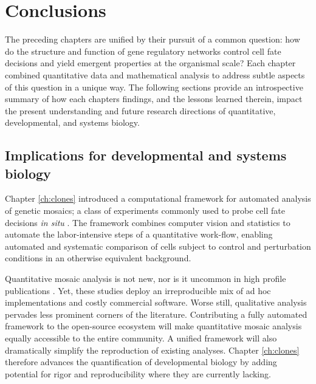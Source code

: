 \graphicspath{ {figures/conclusion/} }


\chapter{Conclusions}
\label{ch:conclusion}

The preceding chapters are unified by their pursuit of a common question: how do the structure and function of gene regulatory networks control cell fate decisions and yield emergent properties at the organismal scale? Each chapter combined quantitative data and mathematical analysis to address subtle aspects of this question in a unique way. The following sections provide an introspective summary of how each chapters findings, and the lessons learned therein, impact the present understanding and future research directions of quantitative, developmental, and systems biology. 

\section{Implications for developmental and systems biology}

Chapter \ref{ch:clones} introduced a computational framework for automated analysis of genetic mosaics; a class of experiments commonly used to probe cell fate decisions \textit{in situ} \cite{Germani2018,Atkins2019}. The framework combines computer vision and statistics to automate the labor-intensive steps of a quantitative work-flow, enabling automated and systematic comparison of cells subject to control and perturbation conditions in an otherwise equivalent background.

Quantitative mosaic analysis is not new, nor is it uncommon in high profile publications \cite{Dai2017,Gavish2016,Li2018}. Yet, these studies deploy an irreproducible mix of ad hoc implementations and costly commercial software. Worse still, qualitative analysis pervades less prominent corners of the literature. Contributing a fully automated framework to the open-source ecosystem will make quantitative mosaic analysis equally accessible to the entire community. A unified framework will also dramatically simplify the reproduction of existing analyses. Chapter \ref{ch:clones} therefore advances the quantification of developmental biology by adding potential for rigor and reproducibility where they are currently lacking.

